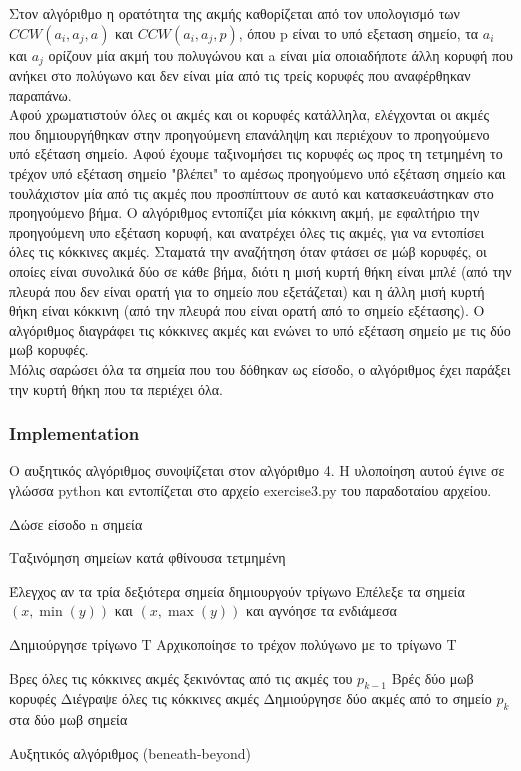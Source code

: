\documentclass[12pt]{article}
\begin{document}
Στον αλγόριθμο η ορατότητα της ακμής καθορίζεται από τον υπολογισμό των \(CCW(a_i, a_j, a)\) και \(CCW(a_i, a_j, p)\), όπου p είναι το υπό εξεταση σημείο, τα \(a_i\) και \(a_j\) ορίζουν μία ακμή του πολυγώνου και a είναι μία οποιαδήποτε άλλη κορυφή που ανήκει στο πολύγωνο και δεν είναι μία από τις τρείς κορυφές που αναφέρθηκαν παραπάνω. \\

Αφού χρωματιστούν όλες οι ακμές και οι κορυφές κατάλληλα, ελέγχονται οι ακμές που δημιουργήθηκαν στην προηγούμενη επανάληψη και περιέχουν το προηγούμενο υπό εξέταση σημείο. Αφού έχουμε ταξινομήσει τις κορυφές ως προς τη τετμημένη το τρέχον υπό εξέταση σημείο "βλέπει" το αμέσως προηγούμενο υπό εξέταση σημείο και τουλάχιστον μία από τις ακμές που προσπίπτουν σε αυτό και κατασκευάστηκαν στο προηγούμενο βήμα. Ο αλγόριθμος εντοπίζει μία κόκκινη ακμή, με εφαλτήριο την προηγούμενη υπο εξέταση κορυφή, και ανατρέχει όλες τις ακμές, για να εντοπίσει όλες τις κόκκινες ακμές. Σταματά την αναζήτηση όταν φτάσει σε μώβ κορυφές, οι οποίες είναι συνολικά δύο σε κάθε βήμα, διότι η μισή κυρτή θήκη είναι μπλέ (από την πλευρά που δεν είναι ορατή για το σημείο που εξετάζεται) και η άλλη μισή κυρτή θήκη είναι κόκκινη (από την πλευρά που είναι ορατή από το σημείο εξέτασης). Ο αλγόριθμος διαγράφει τις κόκκινες ακμές και ενώνει το υπό εξέταση σημείο με τις δύο μωβ κορυφές. \\

Μόλις σαρώσει όλα τα σημεία που του δόθηκαν ως είσοδο, ο αλγόριθμος έχει παράξει την κυρτή θήκη που τα περιέχει όλα. \\

\subsubsection*{Implementation}

Ο αυξητικός αλγόριθμος συνοψίζεται στον αλγόριθμο 4. Η υλοποίηση αυτού έγινε σε γλώσσα python και εντοπίζεται στο αρχείο exercise3.py του παραδοταίου αρχείου.

\begin{algorithm}[H]
	\SetAlgoLined

	Δώσε είσοδο n σημεία \;

	Ταξινόμηση σημείων κατά φθίνουσα τετμημένη \;

	Έλεγχος αν τα τρία δεξιότερα σημεία δημιουργούν τρίγωνο \;
	{Επέλεξε τα σημεία \((x, \min(y))\) και \((x, \max(y))\) και αγνόησε τα ενδιάμεσα\;}

	Δημιούργησε τρίγωνο Τ \;
	Αρχικοποίησε το τρέχον πολύγωνο με το τρίγωνο Τ \;

	{Βρες όλες τις κόκκινες ακμές ξεκινόντας από τις ακμές του \(p_{k-1}\) \;
	Βρές δύο μωβ κορυφές \;
	Διέγραψε όλες τις κόκκινες ακμές \;
	Δημιούργησε δύο ακμές από το σημείο \(p_k\) στα δύο μωβ σημεία \;
	}

	\caption{Αυξητικός αλγόριθμος (beneath-beyond)}
\end{algorithm}
\end{document}
